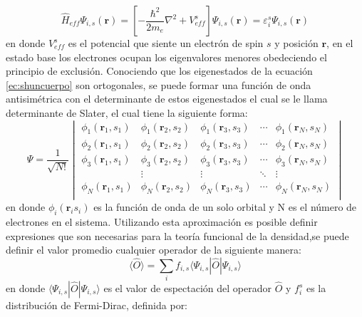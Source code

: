 \documentclass[12pt,a4paper, oneside]{book}
\begin{document}
	\begin{equation}
	\hat H _{eff} \Psi_{i,s} (\pmb{r}) = \left [ -\frac{\hbar^2}{2m_e} \nabla^2 + V_{eff}^{s} \right]\Psi_{i,s} (\pmb{r}) = \varepsilon_i ^{s} \Psi_{i,s} (\pmb{r})  \label{ec:shuncuerpo}
	\end{equation}
	en donde $V_{eff}^{s}$ es el potencial que siente un electr\'on de spin $s$ y posici\'on $\pmb{r}$, en el estado base los electrones ocupan los eigenvalores menores obedeciendo el principio de exclusi\'on. Conociendo que los eigenestados de la ecuaci\'on \ref{ec:shuncuerpo} son ortogonales, se puede formar una funci\'on de onda antisim\'etrica con el determinante de estos eigenestados el cual se le llama determinante de Slater, el cual tiene la siguiente forma:
	\begin{equation}
	\Psi = \frac{1}{\sqrt{N !}}
	\begin{vmatrix}
	\phi_1 (\pmb{r}_1, s_1) & \phi_1 (\pmb{r}_2, s_2) & \phi_1 (\pmb{r}_3, s_3) & \cdots & \phi_1 (\pmb{r}_N, s_N) \\
	\phi_2 (\pmb{r}_1, s_1) & \phi_2 (\pmb{r}_2, s_2) & \phi_2 (\pmb{r}_3, s_3) & \cdots & \phi_2 (\pmb{r}_N, s_N)\\
	\phi_3 (\pmb{r}_1, s_1) & \phi_3 (\pmb{r}_2, s_2) & \phi_3 (\pmb{r}_3, s_3) & \cdots & \phi_3 (\pmb{r}_N, s_N) \\
	                       &  \vdots                     & \vdots                      &  \ddots & \vdots\\
	\phi_N (\pmb{r}_1, s_1) & \phi_N (\pmb{r}_2, s_2) & \phi_N (\pmb{r}_3, s_3) & \cdots & \phi_N (\pmb{r}_N, s_N) \\
	  
	\end{vmatrix} \label{ec:slater}
	\end{equation}
	en donde $\phi_i (\pmb{r}_i s_i)$ es la funci\'on de onda de un solo orbital y N es el n\'umero de electrones en el sistema.
	\newline
	Utilizando esta aproximaci\'on es posible definir expresiones que son necesarias para la teor\'ia funcional de la densidad,se puede definir el valor promedio cualquier operador de la siguiente manera:
	\begin{equation}
	\langle \hat{O} \rangle= \sum_{i} f_{i,s} \langle \Psi_{i,s} | \hat{O} | \Psi_{i,s}\rangle \label{ec:prom}
	\end{equation} 
	\newline
	en donde $\langle \Psi_{i,s} | \hat{O} | \Psi_{i,s} \rangle$ es el valor de espectaci\'on del operador $\hat{O}$ y $f_{i}^{s}$ es la distribuci\'on de Fermi-Dirac, definida por:
\end{document}
